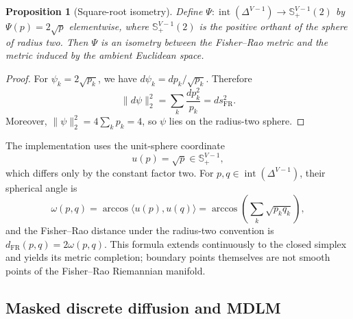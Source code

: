 \documentclass[10pt]{article}
\newtheorem{proposition}{Proposition}
\newcommand{\simplex}{\Delta^{V-1}}
\newcommand{\sphereplus}{\mathbb{S}^{V-1}_{+}}
\newcommand{\FR}{\mathrm{FR}}
\begin{document}
\begin{proposition}[Square-root isometry]
Define $\Psi:\operatorname{int}(\simplex)\rightarrow\sphereplus(2)$ by
$\Psi(p)=2\sqrt{p}$ elementwise, where $\sphereplus(2)$ is the positive orthant of the sphere of
radius two.  Then $\Psi$ is an isometry between the Fisher--Rao metric and the metric induced by the
ambient Euclidean space.
\end{proposition}

\begin{proof}
For $\psi_k=2\sqrt{p_k}$, we have $d\psi_k=dp_k/\sqrt{p_k}$.  Therefore
\begin{equation}
  \lVert d\psi\rVert_2^2
  =\sum_k\frac{dp_k^2}{p_k}
  =ds_{\FR}^2.
\end{equation}
Moreover, $\lVert\psi\rVert_2^2=4\sum_k p_k=4$, so $\psi$ lies on the radius-two sphere.
\end{proof}

The implementation uses the unit-sphere coordinate
\begin{equation}
  u(p)=\sqrt{p}\in\sphereplus,
  \label{eq:sqrt_map}
\end{equation}
which differs only by the constant factor two.  For $p,q\in\operatorname{int}(\simplex)$, their spherical angle is
\begin{equation}
  \omega(p,q)
  =\arccos\langle u(p),u(q)\rangle
  =\arccos\left(\sum_k\sqrt{p_kq_k}\right),
  \label{eq:bhattacharyya_angle}
\end{equation}
and the Fisher--Rao distance under the radius-two convention is $d_{\FR}(p,q)=2\omega(p,q)$.
This formula extends continuously to the closed simplex and yields its metric completion; boundary
points themselves are not smooth points of the Fisher--Rao Riemannian manifold.

\subsection{Masked discrete diffusion and MDLM}
\end{document}
